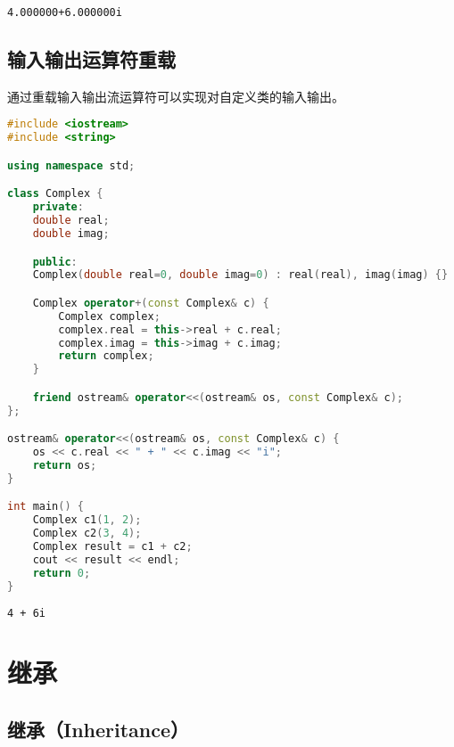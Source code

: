 \begin{tcolorbox}
    \begin{verbatim}
4.000000+6.000000i
	\end{verbatim}
\end{tcolorbox}

\vspace{0.5cm}

\subsection{输入输出运算符重载}

通过重载输入输出流运算符可以实现对自定义类的输入输出。\\


\begin{lstlisting}[language=C++]
#include <iostream>
#include <string>

using namespace std;

class Complex {
    private:
    double real;
    double imag;

    public:
    Complex(double real=0, double imag=0) : real(real), imag(imag) {}

    Complex operator+(const Complex& c) {
        Complex complex;
        complex.real = this->real + c.real;
        complex.imag = this->imag + c.imag;
        return complex;
    }

    friend ostream& operator<<(ostream& os, const Complex& c);
};

ostream& operator<<(ostream& os, const Complex& c) {
    os << c.real << " + " << c.imag << "i";
    return os;
}

int main() {
    Complex c1(1, 2);
    Complex c2(3, 4);
    Complex result = c1 + c2;
    cout << result << endl;
    return 0;
}
\end{lstlisting}

\begin{tcolorbox}
    \begin{verbatim}
4 + 6i
	\end{verbatim}
\end{tcolorbox}

\newpage

\section{继承}

\subsection{继承（Inheritance）}

